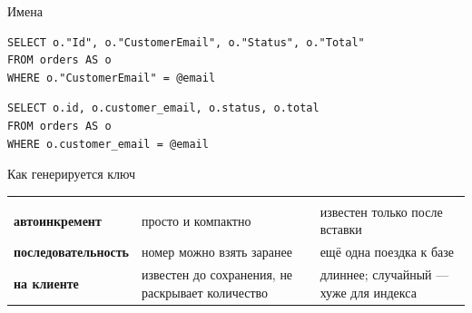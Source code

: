 \documentclass[aspectratio=169,10pt,t]{beamer}
\newcommand{\termsm}{\ttfamily\fontsize{6.6}{7.9}\selectfont}
\begin{document}
\begin{frame}[fragile]{Имена}
  \slidetop

\begin{lstlisting}[style=term,basicstyle=\termsm]
SELECT o."Id", o."CustomerEmail", o."Status", o."Total"
FROM orders AS o
WHERE o."CustomerEmail" = @email
\end{lstlisting}

\begin{lstlisting}[style=term,basicstyle=\termsm]
SELECT o.id, o.customer_email, o.status, o.total
FROM orders AS o
WHERE o.customer_email = @email
\end{lstlisting}

\end{frame}

\begin{frame}{Как генерируется ключ}
  \slidetop
  {\renewcommand{\arraystretch}{1.5}
  \begin{tabular}{@{}L{3.6cm}L{4.7cm}L{4.5cm}@{}}
    &  &  \\
    \textbf{автоинкремент}      & просто и компактно           & известен только
      после вставки \\
    \textbf{последовательность} & номер можно взять заранее    & ещё одна поездка
      к базе \\
    \textbf{на клиенте}         & известен до сохранения, не раскрывает количество
      & длиннее; случайный --- хуже для индекса \\
  \end{tabular}}

  \slidegap
\end{frame}
\end{document}
